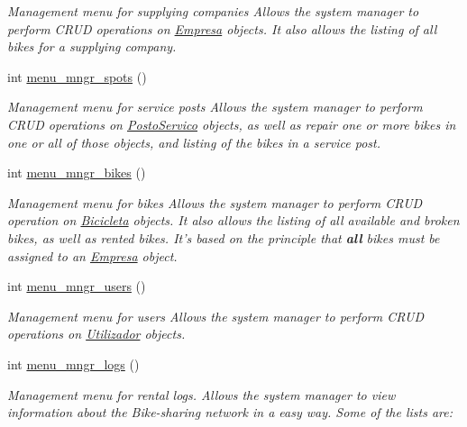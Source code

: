 \begin{DoxyCompactItemize}
\begin{DoxyCompactList}\small\item\em Management menu for supplying companies Allows the system manager to perform C\+R\+U\+D operations on \hyperlink{class_empresa}{Empresa} objects. It also allows the listing of all bikes for a supplying company. \end{DoxyCompactList}\item 
\hypertarget{class_rede_a0d7d6e769f20ff9f3ce54441ec88727e}{int \hyperlink{class_rede_a0d7d6e769f20ff9f3ce54441ec88727e}{menu\+\_\+mngr\+\_\+spots} ()}\label{class_rede_a0d7d6e769f20ff9f3ce54441ec88727e}

\begin{DoxyCompactList}\small\item\em Management menu for service posts Allows the system manager to perform C\+R\+U\+D operations on \hyperlink{class_posto_servico}{Posto\+Servico} objects, as well as repair one or more bikes in one or all of those objects, and listing of the bikes in a service post. \end{DoxyCompactList}\item 
\hypertarget{class_rede_a2f83a9dde6e018ac57f1aefcfca388b2}{int \hyperlink{class_rede_a2f83a9dde6e018ac57f1aefcfca388b2}{menu\+\_\+mngr\+\_\+bikes} ()}\label{class_rede_a2f83a9dde6e018ac57f1aefcfca388b2}

\begin{DoxyCompactList}\small\item\em Management menu for bikes Allows the system manager to perform C\+R\+U\+D operation on \hyperlink{class_bicicleta}{Bicicleta} objects. It also allows the listing of all available and broken bikes, as well as rented bikes. It's based on the principle that {\bfseries all} bikes must be assigned to an \hyperlink{class_empresa}{Empresa} object. \end{DoxyCompactList}\item 
\hypertarget{class_rede_a609866278eb7f37d19397f078a5a6ea6}{int \hyperlink{class_rede_a609866278eb7f37d19397f078a5a6ea6}{menu\+\_\+mngr\+\_\+users} ()}\label{class_rede_a609866278eb7f37d19397f078a5a6ea6}

\begin{DoxyCompactList}\small\item\em Management menu for users Allows the system manager to perform C\+R\+U\+D operations on \hyperlink{class_utilizador}{Utilizador} objects. \end{DoxyCompactList}\item 
int \hyperlink{class_rede_ae11dd331c071a1d4dace9fc89d82e251}{menu\+\_\+mngr\+\_\+logs} ()
\begin{DoxyCompactList}\small\item\em Management menu for rental logs. Allows the system manager to view information about the Bike-\/sharing network in a easy way. Some of the lists are\+: \end{DoxyCompactList}\end{DoxyCompactItemize}



